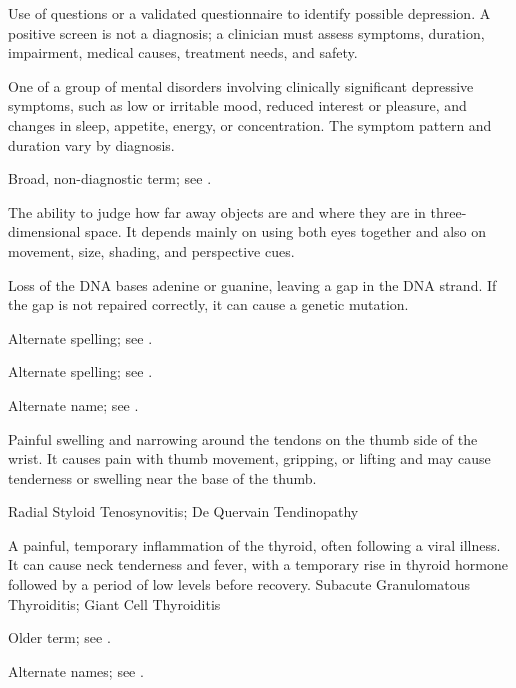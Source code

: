  Use of questions or a validated questionnaire to identify possible depression. A positive screen is not a diagnosis; a clinician must assess symptoms, duration, impairment, medical causes, treatment needs, and safety.

 One of a group of mental disorders involving clinically significant depressive symptoms, such as low or irritable mood, reduced interest or pleasure, and changes in sleep, appetite, energy, or concentration. The symptom pattern and duration vary by diagnosis.

 Broad, non-diagnostic term; see .

 The ability to judge how far away objects are and where they are in three-dimensional space. It depends mainly on using both eyes together and also on movement, size, shading, and perspective cues.

 Loss of the DNA bases adenine or guanine, leaving a gap in the DNA strand. If the gap is not repaired correctly, it can cause a genetic mutation.

 Alternate spelling; see .

 Alternate spelling; see .

 Alternate name; see .

 Painful swelling and narrowing around the tendons on the thumb side of the wrist. It causes pain with thumb movement, gripping, or lifting and may cause tenderness or swelling near the base of the thumb.

\synonyms
Radial Styloid Tenosynovitis; De Quervain Tendinopathy

 A painful, temporary inflammation of the thyroid, often following a viral illness. It can cause neck tenderness and fever, with a temporary rise in thyroid hormone followed by a period of low levels before recovery.
\synonyms
Subacute Granulomatous Thyroiditis; Giant Cell Thyroiditis

 Older term; see .

 Alternate names; see .

